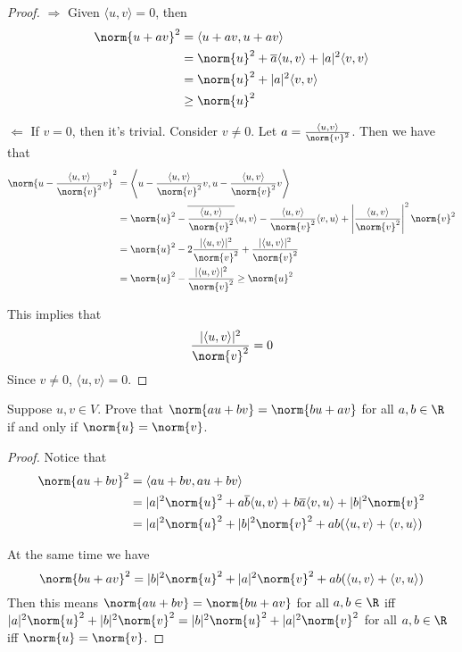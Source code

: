 \documentclass{extarticle}
\begin{document}
\begin{proof}
\(\Rightarrow\) Given \(\langle u,v \rangle = 0\), then
\begin{align*}
    \norm{u + av}^2
    &= \langle u + av, u + av \rangle \\
    &= \norm{u}^2 + \overline{a}\langle u,v \rangle + |a|^2 \langle v,v \rangle \\
    &= \norm{u}^2 + |a|^2 \langle v,v \rangle \\
    &\geq \norm{u}^2
\end{align*}

\(\Leftarrow\) If \(v = 0\), then it's trivial. Consider \(v \neq 0\). Let \(a = \frac{\langle u,v \rangle}{\norm{v}^2}\).
Then we have that
\begin{align*}
    \norm{u - \frac{\langle u,v \rangle}{\norm{v}^2}v}^2
    &= \left\langle u - \frac{\langle u,v \rangle}{\norm{v}^2}v, u - \frac{\langle u,v \rangle}{\norm{v}^2}v \right\rangle \\
    &= \norm{u}^2 - \overline{\frac{\langle u,v \rangle}{\norm{v}^2}} \langle u, v \rangle
    - \frac{\langle u,v \rangle}{\norm{v}^2} \langle v,u \rangle +
    \left\lvert \frac{\langle u,v \rangle}{\norm{v}^2} \right\rvert^2 \norm{v}^2 \\
    &= \norm{u}^2 - 2\frac{|\langle u,v \rangle|^2}{\norm{v}^2} + \frac{|\langle u,v \rangle|^2}{\norm{v}^2} \\
    &= \norm{u}^2 - \frac{|\langle u,v \rangle|^2}{\norm{v}^2} \geq \norm{u}^2
\end{align*}

This implies that
\[\frac{|\langle u,v \rangle|^2}{\norm{v}^2} = 0\]
Since \(v \neq 0\), \(\langle u,v \rangle = 0\).
\end{proof}

\begin{problem}{7}
    Suppose \(u, v \in V\). Prove that \(\norm{au + bv} = \norm{bu + av}\) for all
    \(a, b \in \R\) if and only if \(\norm{u} = \norm{v}\).
\end{problem}

\begin{proof}
Notice that
\begin{align*}
    \norm{au + bv}^2
    &= \langle au + bv, au+bv \rangle \\
    &= |a|^2 \norm{u}^2 + a\overline{b}\langle u,v \rangle
    + b\overline{a}\langle v,u \rangle + |b|^2 \norm{v}^2  \\
    &=|a|^2 \norm{u}^2 + |b|^2 \norm{v}^2 + ab(\langle u,v \rangle + \langle v,u \rangle)
\end{align*}

At the same time we have
\[\norm{bu + av}^2 = |b|^2 \norm{u}^2 + |a|^2 \norm{v}^2 + ab(\langle u,v \rangle + \langle v,u \rangle)\]
Then this means \(\norm{au + bv} = \norm{bu + av}\) for all
\(a, b \in \R\) iff \(|a|^2 \norm{u}^2 + |b|^2 \norm{v}^2 = |b|^2 \norm{u}^2 + |a|^2 \norm{v}^2 \)
for all \(a, b \in \R\) iff \(\norm{u} = \norm{v}\).
\end{proof}
\end{document}
